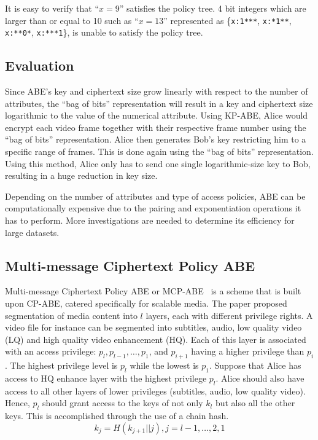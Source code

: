 \documentclass[hyp,a4paper,12pt,openbib]{socreport}
\begin{document}
It is easy to verify that ``$x=9$'' satisfies the policy tree. 4 bit integers which are larger than or equal to 10 such as ``$x=13$'' represented as \{\texttt{x:1***}, \texttt{x:*1**}, \texttt{x:**0*}, \texttt{x:***1}\}, is unable to satisfy the policy tree.
 
 


\subsection{Evaluation}
 
 
Since ABE's key and ciphertext size grow linearly with respect to the number of attributes, the ``bag of bits'' representation will result in a key and ciphertext size logarithmic to the value of the numerical attribute. Using KP-ABE, Alice would encrypt each video frame together with their respective frame number using the ``bag of bits'' representation. Alice then generates Bob's key restricting him to a specific range of frames. This is done again using the ``bag of bits'' representation. Using this method, Alice only has to send one single logarithmic-size key to Bob, resulting in a huge reduction in key size.

Depending on the number of attributes and type of access policies, ABE can be computationally expensive due to the pairing and exponentiation operations it has to perform. More investigations are needed to determine its efficiency for large datasets. 

\subsection{Multi-message Ciphertext Policy ABE}
\label{chapt:mcp-abe}
Multi-message Ciphertext Policy ABE or MCP-ABE~\cite{2013scalable} is a scheme that is built upon CP-ABE, catered specifically for scalable media. The paper proposed segmentation of media content into $l$ layers, each with different privilege rights. A video file for instance can be segmented into subtitles, audio, low quality video (LQ) and high quality video enhancement (HQ). Each of this layer is associated with an access privilege: $p_l, p_{l-1}, \dots ,p_1$, and $p_{i+1}$ having a higher privilege than $p_{i}$. The highest privilege level is $p_l$ while the lowest is $p_1$. Suppose that Alice has access to HQ enhance layer with the highest privilege $p_l$.  Alice should also have access to all other layers of lower privileges (subtitles, audio, low quality video). Hence, $p_l$ should grant access to the keys of not only $k_l$ but also all the other keys. This is accomplished through the use of a chain hash. 
\begin{equation}\label{eq:hash-chain}
k_j = H(k_{j+1}||j), j=l-1, \dots, 2, 1
\end{equation}
\end{document}
